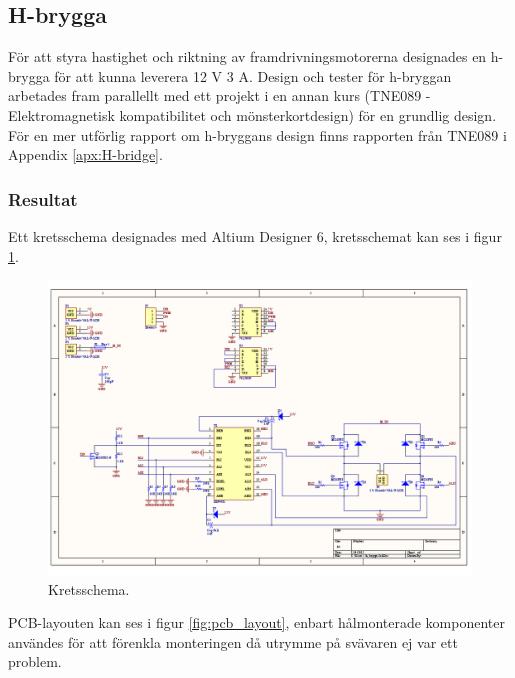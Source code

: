 \subsection{H-brygga}
För att styra hastighet och riktning av framdrivningsmotorerna designades en
h-brygga för att kunna leverera 12 V 3 A. Design och tester för h-bryggan
arbetades fram parallellt med ett projekt i en annan kurs (TNE089 -
Elektromagnetisk kompatibilitet och mönsterkortdesign) för en grundlig design.
För en mer utförlig rapport om h-bryggans design finns rapporten från TNE089 i
Appendix \ref{apx:H-bridge}.

\subsubsection{Resultat}
Ett kretsschema designades med Altium Designer 6, kretsschemat kan ses i figur \ref{fig:h_brygga_schema}.

\begin{landscape}
\begin{figure}[htbp!]
\centering
\includegraphics[width=20cm]{../../includes/figures/h_brygga_schematic}
\caption{Kretsschema.}
\label{fig:h_brygga_schema}
\end{figure}
\end{landscape}

PCB-layouten kan ses i figur \ref{fig:pcb_layout}, enbart hålmonterade komponenter användes för att förenkla monteringen då utrymme på svävaren ej var ett problem.

